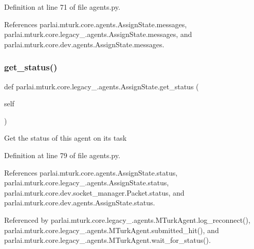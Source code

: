 Definition at line 71 of file agents.\+py.



References parlai.\+mturk.\+core.\+agents.\+Assign\+State.\+messages, parlai.\+mturk.\+core.\+legacy\+\_.\+agents.\+Assign\+State.\+messages, and parlai.\+mturk.\+core.\+dev.\+agents.\+Assign\+State.\+messages.

\mbox{\label{classparlai_1_1mturk_1_1core_1_1legacy__2018_1_1agents_1_1AssignState_aa06c7d109d7b208a9dcdef0d3fa6c90f}} 
\subsubsection{\texorpdfstring{get\+\_\+status()}{get\_status()}}
{\footnotesize\ttfamily def parlai.\+mturk.\+core.\+legacy\+\_.\+agents.\+Assign\+State.\+get\+\_\+status (\begin{DoxyParamCaption}\item[{}]{self }\end{DoxyParamCaption})}

\begin{DoxyVerb}Get the status of this agent on its task\end{DoxyVerb}
 

Definition at line 79 of file agents.\+py.



References parlai.\+mturk.\+core.\+agents.\+Assign\+State.\+status, parlai.\+mturk.\+core.\+legacy\+\_.\+agents.\+Assign\+State.\+status, parlai.\+mturk.\+core.\+dev.\+socket\+\_\+manager.\+Packet.\+status, and parlai.\+mturk.\+core.\+dev.\+agents.\+Assign\+State.\+status.



Referenced by parlai.\+mturk.\+core.\+legacy\+\_.\+agents.\+M\+Turk\+Agent.\+log\+\_\+reconnect(), parlai.\+mturk.\+core.\+legacy\+\_.\+agents.\+M\+Turk\+Agent.\+submitted\+\_\+hit(), and parlai.\+mturk.\+core.\+legacy\+\_.\+agents.\+M\+Turk\+Agent.\+wait\+\_\+for\+\_\+status().

